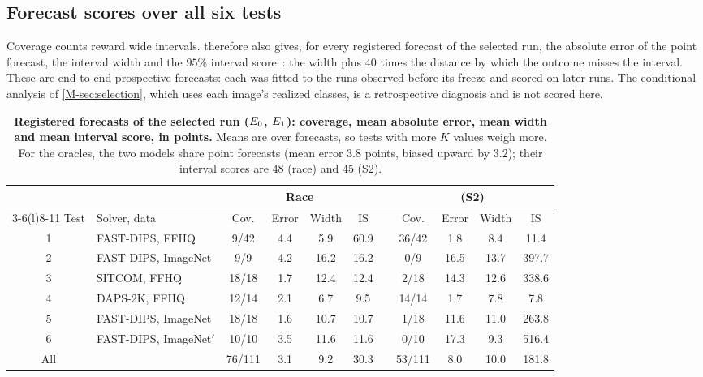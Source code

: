 \subsection{Forecast scores over all six tests}
\label{sec:suppl-scores}
Coverage counts reward wide intervals.
 therefore also gives, for every registered forecast of the selected run, the absolute error of the point forecast, the interval width and the $95\%$ interval score~\cite{gneiting2007scoring}: the width plus $40$ times the distance by which the outcome misses the interval.
These are end-to-end prospective forecasts: each was fitted to the runs observed before its freeze and scored on later runs.
The conditional analysis of \cref{M-sec:selection}, which uses each image's realized classes, is a retrospective diagnosis and is not scored here.

\begin{table}[h]
\centering\small
\setlength{\tabcolsep}{4pt}
\begin{tabular}{@{}cl cccc c cccc@{}}
\toprule
 & & \multicolumn{4}{c}{Race} & & \multicolumn{4}{c}{(S2)} \\
\cmidrule(lr){3-6}\cmidrule(l){8-11}
Test & Solver, data & Cov. & Error & Width & IS & & Cov. & Error & Width & IS \\
\midrule
1 & FAST-DIPS, FFHQ & 9/42 & 4.4 & 5.9 & 60.9 & & 36/42 & 1.8 & 8.4 & 11.4 \\
2 & FAST-DIPS, ImageNet & 9/9 & 4.2 & 16.2 & 16.2 & & 0/9 & 16.5 & 13.7 & 397.7 \\
3 & SITCOM, FFHQ & 18/18 & 1.7 & 12.4 & 12.4 & & 2/18 & 14.3 & 12.6 & 338.6 \\
4 & DAPS-2K, FFHQ & 12/14 & 2.1 & 6.7 & 9.5 & & 14/14 & 1.7 & 7.8 & 7.8 \\
5 & FAST-DIPS, ImageNet & 18/18 & 1.6 & 10.7 & 10.7 & & 1/18 & 11.6 & 11.0 & 263.8 \\
6 & FAST-DIPS, ImageNet$'$ & 10/10 & 3.5 & 11.6 & 11.6 & & 0/10 & 17.3 & 9.3 & 516.4 \\
\midrule
All & & 76/111 & 3.1 & 9.2 & 30.3 & & 53/111 & 8.0 & 10.0 & 181.8 \\
\bottomrule
\end{tabular}
\caption{\textbf{Registered forecasts of the selected run ($E_0$, $E_1$): coverage, mean absolute error, mean width and mean interval score, in points.} Means are over forecasts, so tests with more $K$ values weigh more. For the oracles, the two models share point forecasts (mean error $3.8$ points, biased upward by $3.2$); their interval scores are $48$ (race) and $45$ (S2).}
\label{tab:suppl-scores}
\end{table}

